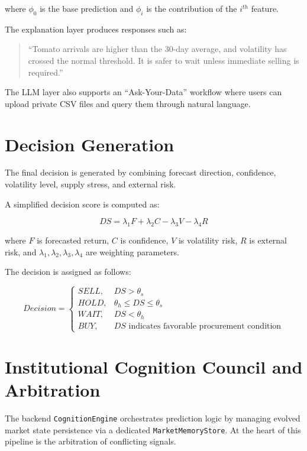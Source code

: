 \documentclass[12pt,a4paper]{report}
\begin{document}
where $\phi_0$ is the base prediction and $\phi_i$ is the contribution of the $i^{th}$ feature.

The explanation layer produces responses such as:

\begin{quote}
``Tomato arrivals are higher than the 30-day average, and volatility has crossed the normal threshold. It is safer to wait unless immediate selling is required.''
\end{quote}

The LLM layer also supports an ``Ask-Your-Data'' workflow where users can upload private CSV files and query them through natural language.

\section{Decision Generation}

The final decision is generated by combining forecast direction, confidence, volatility level, supply stress, and external risk.

A simplified decision score is computed as:

\begin{equation}
DS = \lambda_1 F + \lambda_2 C - \lambda_3 V - \lambda_4 R
\end{equation}

where $F$ is forecasted return, $C$ is confidence, $V$ is volatility risk, $R$ is external risk, and $\lambda_1, \lambda_2, \lambda_3, \lambda_4$ are weighting parameters.

The decision is assigned as follows:

\begin{equation}
Decision =
\begin{cases}
SELL, & DS > \theta_s \\
HOLD, & \theta_h \leq DS \leq \theta_s \\
WAIT, & DS < \theta_h \\
BUY, & DS \text{ indicates favorable procurement condition}
\end{cases}
\end{equation}

\section{Institutional Cognition Council and Arbitration}

The backend \texttt{CognitionEngine} orchestrates prediction logic by managing evolved market state persistence via a dedicated \texttt{MarketMemoryStore}. At the heart of this pipeline is the arbitration of conflicting signals. 
\end{document}
